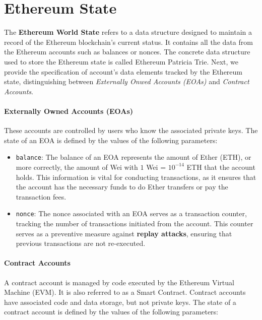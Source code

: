 


\section{Ethereum State}

The \textbf{Ethereum World State} refers to a data structure designed to maintain a record of the Ethereum blockchain's current status. It contains all the data from the Ethereum accounts such as balances or nonces. The concrete data structure used to store the Ethereum state is called Ethereum Patricia Trie. Next, we provide the specification of account's data elements tracked by the Ethereum state, distinguishing between \textit{Externally Onwed Accounts (EOAs)} and \textit{Contract Accounts}.

\paragraph*{Externally Owned Accounts (EOAs)}

These accounts are controlled by users who know the associated private keys. The state of an EOA is defined by the values of the following parameters:

\begin{itemize}
\item \texttt{balance}: The balance of an EOA represents the amount of Ether (ETH), or more correctly, the amount of Wei with $1$ Wei = $10^{-14}$ ETH that the account holds. This information is vital for conducting transactions, as it ensures that the account has the necessary funds to do Ether transfers or pay the transaction fees.

\item \texttt{nonce}: The nonce associated with an EOA serves as a transaction counter, tracking the number of transactions initiated from the account. This counter serves as a preventive measure against \textbf{replay attacks}, ensuring that previous transactions are not re-executed.

\end{itemize}

\paragraph*{Contract Accounts}

A contract account is managed by code executed by the Ethereum Virtual Machine (EVM). It is also referred to as a Smart Contract. Contract accounts have associated code and data storage, but not private keys. The state of a contract account is defined by the values of the following parameters:

